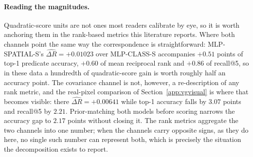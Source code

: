 \paragraph{Reading the magnitudes.} Quadratic-score units are not ones most readers
calibrate by eye, so it is worth anchoring them in the rank-based metrics this
literature reports. Where both channels point the same way the correspondence is
straightforward: MLP-SPATIAL-S's $\widehat{\Delta R}=+0.01023$ over MLP-CLASS-S
accompanies $+0.51$ points of top-1 predicate accuracy, $+0.60$ of mean reciprocal rank
and $+0.86$ of recall@5, so in these data a hundredth of quadratic-score gain is worth
roughly half an accuracy point. The covariance channel is not, however, a re-description
of any rank metric, and the real-pixel comparison of Section~\ref{app:vgvisual} is
where that becomes visible: there $\widehat{\Delta R}=+0.00641$ while top-1 accuracy
falls by $3.07$ points and recall@5 by $2.21$. Prior-matching both models before scoring
narrows the accuracy gap to $2.17$ points without closing it. The rank metrics aggregate
the two channels into one number; when the channels carry opposite signs, as they do
here, no single such number can represent both, which is precisely the situation the
decomposition exists to report.

\begin{table}[t]
\centering
\caption{WAGER decomposition on 227,337 identified VG150 PredCls relations. Gains use
the quadratic score. CI is image-cluster robust; $p$ is the 499-shift relation-level
randomization diagnostic (granularity floor $.002$). ``--'' denotes an undefined share
because total gain is negative. The MLP-CLASS row's zero-width interval is exact by
construction, not a sampling statement: a gain vector constant within every cell makes
the antisymmetric kernel identically zero (Theorem~\ref{thm:population}), so no
variability exists for the interval to measure.}
\label{tab:wager-results}
\end{table}

